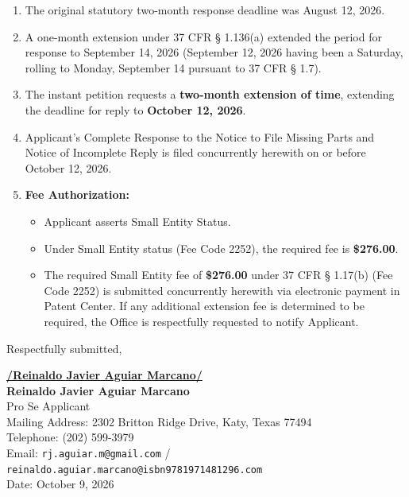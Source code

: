 \documentclass[11pt,letterpaper]{article}
\begin{document}
\begin{enumerate}[leftmargin=2em, itemsep=4pt]
    \item The original statutory two-month response deadline was August 12, 2026.
    \item A one-month extension under 37 CFR \S{} 1.136(a) extended the period for response to September 14, 2026 (September 12, 2026 having been a Saturday, rolling to Monday, September 14 pursuant to 37 CFR \S{} 1.7).
    \item The instant petition requests a \textbf{two-month extension of time}, extending the deadline for reply to \textbf{October 12, 2026}.
    \item Applicant's Complete Response to the Notice to File Missing Parts and Notice of Incomplete Reply is filed concurrently herewith on or before October 12, 2026.
    \item \textbf{Fee Authorization:} 
    \begin{itemize}
        \item Applicant asserts Small Entity Status.
        \item Under Small Entity status (Fee Code 2252), the required fee is \textbf{\$276.00}.
        \item The required Small Entity fee of \textbf{\$276.00} under 37 CFR \S{} 1.17(b) (Fee Code 2252) is submitted concurrently herewith via electronic payment in Patent Center. If any additional extension fee is determined to be required, the Office is respectfully requested to notify Applicant.
    \end{itemize}
\end{enumerate}

\vspace{1.0cm}
\begin{singlespace}
\noindent Respectfully submitted, \par\vspace{1.5cm}
\underline{\textbf{/Reinaldo Javier Aguiar Marcano/}} \\
\textbf{Reinaldo Javier Aguiar Marcano} \\
Pro Se Applicant \\
Mailing Address: 2302 Britton Ridge Drive, Katy, Texas 77494 \\
Telephone: (202) 599-3979 \\
Email: \texttt{rj.aguiar.m@gmail.com} / \texttt{reinaldo.aguiar.marcano@isbn9781971481296.com} \\
Date: October 9, 2026
\end{singlespace}
\end{document}
